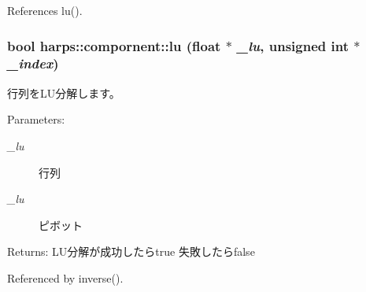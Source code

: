 References lu().
\subsubsection[lu]{\setlength{\rightskip}{0pt plus 5cm}bool harps::compornent::lu (float $\ast$ {\em \_\-lu}, \/  unsigned int $\ast$ {\em \_\-index})}\label{namespaceharps_1_1compornent_52686693ee6e21316ae152459d1263eb}


行列をLU分解します。 \begin{Desc}
\item[Parameters:]
\begin{description}
\item[{\em \_\-lu}]行列 \item[{\em \_\-lu}]ピボット \end{description}
\end{Desc}
\begin{Desc}
\item[Returns:]LU分解が成功したらtrue 失敗したらfalse \end{Desc}


Referenced by inverse().